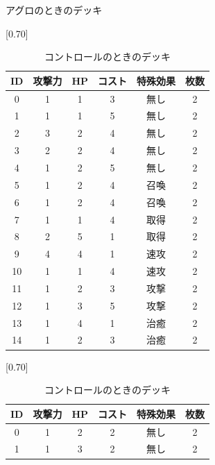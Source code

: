 \documentclass[12pt]{jarticle}
\begin{document}
    \begin{table}[htbp]
      \begin{minipage}[c]{0.5\hsize}
        \centering
        \caption{アグロのときのデッキ}
        \label{table:agurodeck}
        \vspace{-0.3cm}
        \scalebox{0.70}[0.70]{
          \begin{tabular}{|c|c|c|c|c|c|}
            \hline
            ID & 攻撃力 & HP & コスト & 特殊効果 & 枚数 \\ \hline \hline
            0 & 1 & 1 & 3 & 無し & 2 \\ \hline
            1 & 1 & 1 & 5 & 無し & 2 \\ \hline
            2 & 3 & 2 & 4 & 無し & 2 \\ \hline
            3 & 2 & 2 & 4 & 無し & 2 \\ \hline
            4 & 1 & 2 & 5 & 無し & 2 \\ \hline
            5 & 1 & 2 & 4 & 召喚 & 2 \\ \hline
            6 & 1 & 2 & 4 & 召喚 & 2 \\ \hline
            7 & 1 & 1 & 4 & 取得 & 2 \\ \hline
            8 & 2 & 5 & 1 & 取得 & 2 \\ \hline
            9 & 4 & 4 & 1 & 速攻 & 2 \\ \hline
            10 & 1 & 1 & 4 & 速攻 & 2 \\ \hline
            11 & 1 & 2 & 3 & 攻撃 & 2 \\ \hline
            12 & 1 & 3 & 5 & 攻撃 & 2 \\ \hline
            13 & 1 & 4 & 1 & 治癒 & 2 \\ \hline
            14 & 1 & 2 & 3 & 治癒 & 2 \\ \hline
            \end{tabular}
        }
      \end{minipage}
      \begin{minipage}[c]{0.5\hsize}
        \centering
        \caption{コントロールのときのデッキ}
        \label{table:controlldeck}
        \vspace{-0.3cm}
        \scalebox{0.70}[0.70]{
          \begin{tabular}{|c|c|c|c|c|c|}
            \hline
            ID & 攻撃力 & HP & コスト & 特殊効果 & 枚数 \\ \hline \hline
            0 & 1 & 2 & 2 & 無し & 2 \\ \hline
            1 & 1 & 3 & 2 & 無し & 2 \\ \hline

\end{tabular}}
\end{minipage}
\end{table}
\end{document}
